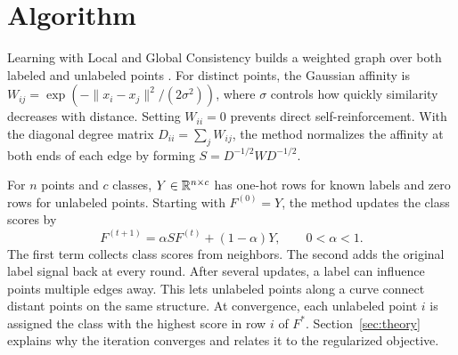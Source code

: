 \section{Algorithm}\label{sec:algorithm}

Learning with Local and Global Consistency builds a weighted graph over
both labeled and unlabeled points \citep[Section~2]{zhou2003consistency}.
For distinct points, the Gaussian affinity is
$W_{ij}=\exp(-\lVert x_i-x_j\rVert^2/(2\sigma^2))$, where $\sigma$ controls
how quickly similarity decreases with distance. Setting $W_{ii}=0$
prevents direct self-reinforcement. With the diagonal degree matrix
$D_{ii}=\sum_j W_{ij}$, the method normalizes the affinity at both ends
of each edge by forming $S=D^{-1/2}WD^{-1/2}$.

For $n$ points and $c$ classes, $Y\in\mathbb{R}^{n\times c}$ has one-hot rows for
known labels and zero rows for unlabeled points. Starting with $F^{(0)}=Y$,
the method updates the class scores by
\begin{equation}
  F^{(t+1)}=\alpha SF^{(t)}+(1-\alpha)Y,\qquad 0<\alpha<1.
\end{equation}
The first term collects class scores from neighbors. The second adds the
original label signal back at every round. After several updates, a label
can influence points multiple edges away. This lets unlabeled points along
a curve connect distant points on the same structure. At convergence,
each unlabeled point $i$ is assigned the class with the highest score in
row $i$ of $F^*$. Section~\ref{sec:theory} explains why the iteration
converges and relates it to the regularized objective.
